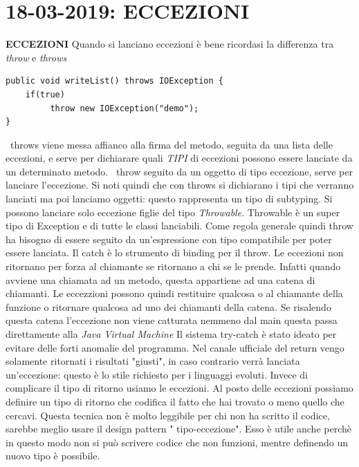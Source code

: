 

\newpage
\section{18-03-2019: ECCEZIONI}
\textbf{ECCEZIONI} \newline
Quando si lanciano eccezioni è bene ricordasi la differenza tra \textit{throw} e \textit{throws}
\begin{lstlisting}
public void writeList() throws IOException {
	if(true)
		 throw new IOException("demo"); 
}
\end{lstlisting}
\textbullet\ throws viene messa affianco alla firma del metodo, seguita da una lista delle eccezioni, e serve per dichiarare quali \textit{TIPI} di eccezioni possono essere lanciate da un determinato metodo. \newline
\textbullet\ throw seguito da un oggetto di tipo eccezione, serve per lanciare l'eccezione. \newline
Si noti quindi che con throws si dichiarano i tipi che verranno lanciati ma poi lanciamo oggetti: questo rappresenta un tipo di subtyping.
\newline
Si possono lanciare solo eccezione figlie del tipo \textit{Throwable}. Throwable è un super tipo di Exception e di tutte le classi lanciabili. \newline
Come regola generale quindi throw ha bisogno di essere seguito da un'espressione con tipo compatibile per poter essere lanciata.\newline
Il catch è lo strumento di binding per il throw. \newline
Le eccezioni non ritornano  per forza al chiamante se ritornano a chi se le prende. Infatti quando avviene una chiamata ad un metodo, questa appartiene ad una catena di chiamanti. Le eccezzioni possono quindi restituire qualcosa o al chiamante della funzione o ritornare qualcosa ad uno dei chiamanti della catena. Se risalendo questa catena l'eccezione non viene catturata nemmeno dal main questa passa direttamente alla \textit{Java Virtual Machine}\newline
Il sistema try-catch è stato ideato per evitare delle forti anomalie del programma. \newline
Nel canale ufficiale del return vengo solamente ritornati i risultati "giusti", in caso contrario verrà lanciata un'eccezione: questo è lo stile richiesto per i linguaggi evoluti. Invece di complicare il tipo di ritorno usiamo le eccezioni. \newline
Al posto delle eccezioni possiamo definire  un tipo di ritorno che codifica il fatto che hai trovato o meno quello che cercavi. Questa tecnica non è molto leggibile per chi non ha scritto il codice, sarebbe meglio usare il design pattern " tipo-eccezione". Esso è utile anche perchè in questo modo non si può scrivere codice che non funzioni, mentre definendo un nuovo tipo è possibile.


